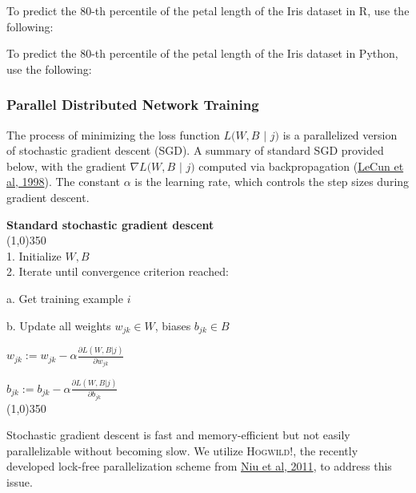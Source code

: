 To predict the 80-th percentile of the petal length of the Iris dataset in R, use the following:

\waterExampleInR


To predict the 80-th percentile of the petal length of the Iris dataset in Python, use the following:

\waterExampleInPython


\newpage
\subsubsection{Parallel Distributed Network Training} 

The process of minimizing the loss function $L(W,B$ $|$ $j)$ is a parallelized version of stochastic gradient descent (SGD). A summary of standard SGD provided below, with the gradient $\nabla L(W,B$ $|$ $j)$ computed via backpropagation (\href{http://yann.lecun.com/exdb/publis/pdf/lecun-98b.pdf}{LeCun et al, 1998}). The constant $\alpha$ is the learning rate, which controls the step sizes during gradient descent.


{\bf{\footnotesize{Standard stochastic gradient descent}}}
\\
\line(1,0){350}
\\
1. Initialize $W,B$ 
\\
2. Iterate until convergence criterion reached:

\hspace{1cm} a. Get training example $i$

\hspace{1cm} b. Update all weights $w_{jk} \in W$, biases $b_{jk} \in B$

\hspace{2cm}  $w_{jk} := w_{jk} - \alpha \frac{\partial L(W,B | j)}{\partial w_{jk}}$

\hspace{2cm} $b_{jk} := b_{jk} - \alpha \frac{\partial L(W,B | j)}{\partial b_{jk}}$
\\
\line(1,0){350}

Stochastic gradient descent is fast and memory-efficient but not easily parallelizable without becoming slow. We utilize \textsc{Hogwild!}, the recently developed lock-free parallelization scheme from \href{http://i.stanford.edu/hazy/papers/hogwild-nips.pdf}{Niu et al, 2011}, to address this issue. 

